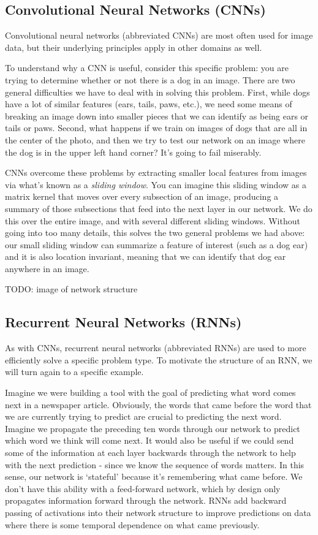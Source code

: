 \subsection{Convolutional Neural Networks (CNNs)}
Convolutional neural networks (abbreviated CNNs) are most often used for image data, but their underlying principles apply in other domains as well.

To understand why a CNN is useful, consider this specific problem: you are trying to determine whether or not there is a dog in an image. There are two general difficulties we have to deal with in solving this problem. First, while dogs have a lot of similar features (ears, tails, paws, etc.), we need some means of breaking an image down into smaller pieces that we can identify as being ears or tails or paws. Second, what happens if we train on images of dogs that are all in the center of the photo, and then we try to test our network on an image where the dog is in the upper left hand corner? It's going to fail miserably.

CNNs overcome these problems by extracting smaller local features from images via what's known as a \textit{sliding window}. You can imagine this sliding window as a matrix kernel that moves over every subsection of an image, producing a summary of those subsections that feed into the next layer in our network. We do this over the entire image, and with several different sliding windows. Without going into too many details, this solves the two general problems we had above: our small sliding window can summarize a feature of interest (such as a dog ear) and it is also location invariant, meaning that we can identify that dog ear anywhere in an image.

TODO: image of network structure

\subsection{Recurrent Neural Networks (RNNs)}
As with CNNs, recurrent neural networks (abbreviated RNNs) are used to more efficiently solve a specific problem type. To motivate the structure of an RNN, we will turn again to a specific example.

Imagine we were building a tool with the goal of predicting what word comes next in a newspaper article. Obviously, the words that came before the word that we are currently trying to predict are crucial to predicting the next word. Imagine we propagate the preceding ten words through our network to predict which word we think will come next. It would also be useful if we could send some of the information at each layer backwards through the network to help with the next prediction - since we know the sequence of words matters. In this sense, our network is `stateful' because it's remembering what came before. We don't have this ability with a feed-forward network, which by design only propagates information forward through the network. RNNs add backward passing of activations into their network structure to improve predictions on data where there is some temporal dependence on what came previously.

